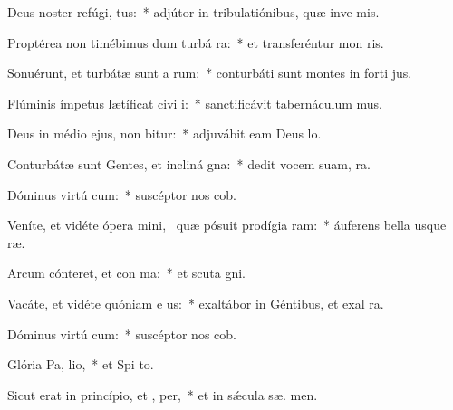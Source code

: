 \item Deus noster refúgi,  tus:~* adjútor in tribulatiónibus, quæ inve  mis.
\item Proptérea non timébimus dum turbá ra:~* et transferéntur mon   ris.
\item Sonuérunt, et turbátæ sunt a rum:~* conturbáti sunt montes in forti jus.
\item Flúminis ímpetus lætíficat civi i:~* sanctificávit tabernáculum  mus.
\item Deus in médio ejus, non bitur:~* adjuvábit eam Deus  lo.
\item Conturbátæ sunt Gentes, et incliná  gna:~* dedit vocem suam,   ra.
\item Dóminus virtú cum:~* suscéptor nos  cob.
\item Veníte, et vidéte ópera mini,~\pscross{} quæ pósuit prodígia  ram:~* áuferens bella usque   ræ.
\item Arcum cónteret, et con ma:~* et scuta  gni.
\item Vacáte, et vidéte quóniam e  us:~* exaltábor in Géntibus, et exal  ra.
\item Dóminus virtú cum:~* suscéptor nos  cob.
\item Glória Pa,  lio,~* et Spi to.
\item Sicut erat in princípio, et ,  per,~* et in sǽcula sæ. men.
